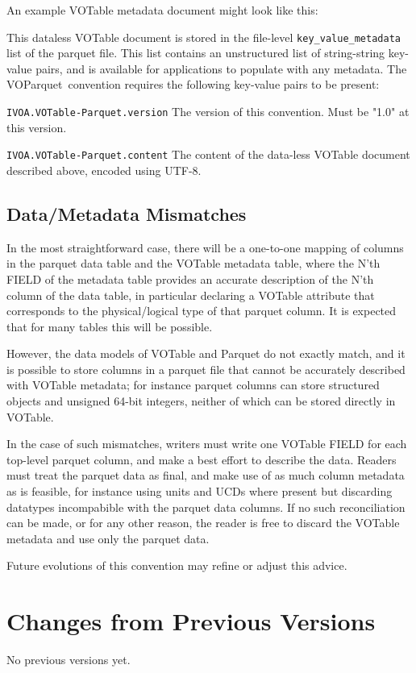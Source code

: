 \documentclass[11pt,a4paper]{ivoa}
\newcommand{\voparquet}{VOParquet}
\begin{document}
An example VOTable metadata document might look like this:


This dataless VOTable document is stored in the file-level
{\tt key\_value\_metadata} list of the parquet file.
This list contains an unstructured list of string-string key-value pairs,
and is available for applications to populate with any metadata.
The \voparquet\ convention requires the following key-value pairs
to be present:
\begin{bigdescription}
\item[{\tt IVOA.VOTable-Parquet.version}]
   The version of this convention.  Must be "1.0" at this version.
\item[{\tt IVOA.VOTable-Parquet.content}]
   The content of the data-less VOTable document described above,
   encoded using UTF-8.
\end{bigdescription}

\subsection{Data/Metadata Mismatches}

In the most straightforward case, there will be a one-to-one mapping
of columns in the parquet data table and the VOTable metadata table,
where the N'th FIELD of the metadata table provides an accurate
description of the N'th column of the data table,
in particular declaring a VOTable  attribute that
corresponds to the physical/logical type of that parquet column.
It is expected that for many tables this will be possible.

However, the data models of VOTable and Parquet do not exactly match,
and it is possible to store columns in a parquet file that cannot be
accurately described with VOTable metadata;
for instance parquet columns can store structured objects and
unsigned 64-bit integers, neither of which can be stored directly
in VOTable.

In the case of such mismatches, writers must write one VOTable FIELD
for each top-level parquet column,
and make a best effort to describe the data.
Readers must treat the parquet data as final,
and make use of as much column metadata as is feasible,
for instance using units and UCDs where present but discarding datatypes
incompabible with the parquet data columns.
If no such reconciliation can be made, or for any other reason,
the reader is free to discard the VOTable metadata and use only
the parquet data.

Future evolutions of this convention may refine or adjust this advice.



\appendix
\section{Changes from Previous Versions}

No previous versions yet.


\end{document}
